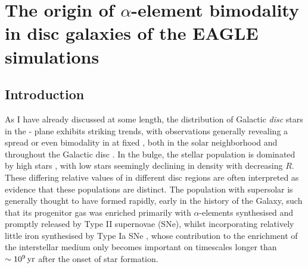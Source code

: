 \chapter{The origin of $\alpha$-element bimodality in disc galaxies of the EAGLE simulations}
\label{chapter:eagle}
\section{Introduction}
 \label{sec:intro}

As I have already discussed at some length, the distribution of Galactic  {\it disc} stars in the \afe{}-\feh{} plane exhibits striking trends, with observations generally revealing a spread or even bimodality in \afe{} at fixed \feh{}, both in the solar neighborhood \citep[e.g.][]{1998A&A...338..161F,2003A&A...410..527B,2000A&A...358..671G,2000AJ....120.2513P,2004AJ....128.1177V,2005A&A...433..185B,2012A&A...545A..32A,2014A&A...562A..71B} and throughout the Galactic disc \citep[][]{2014A&A...564A.115A,2014ApJ...796...38N,2015ApJ...808..132H}. In the bulge, the stellar population is dominated by high \afe{} stars \citep[e.g.][]{2017arXiv170202971B}, with low \afe{} stars seemingly declining in density with decreasing $R$. These differing relative values of \afe{} in different disc regions are often interpreted as evidence that these populations are distinct. The population with supersolar \afe{} is generally thought to have formed rapidly, early in the history of the Galaxy, such that its progenitor gas was enriched primarily with $\alpha$-elements synthesised and promptly released by Type II supernovae (SNe), whilst incorporating relatively little iron synthesised by Type Ia SNe \citep[e.g.,][]{1989ARA&A..27..279W,1997ARA&A..35..503M}, whose contribution to the enrichment of the interstellar medium only becomes important on timescales longer than $\sim 10^9\,{\rm yr}$ after the onset of star formation.

